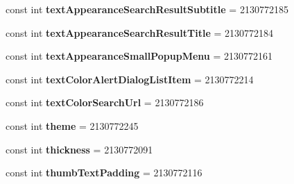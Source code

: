 \begin{DoxyCompactItemize}
\item 
\hypertarget{classClient_1_1Droid_1_1Resource_1_1Attribute_afed6747dd8e5210c715c7e0a85077b0e}{}const int {\bfseries text\+Appearance\+Search\+Result\+Subtitle} = 2130772185\label{classClient_1_1Droid_1_1Resource_1_1Attribute_afed6747dd8e5210c715c7e0a85077b0e}

\item 
\hypertarget{classClient_1_1Droid_1_1Resource_1_1Attribute_ad239aa2f1ee8edb9c2525303c9fb14af}{}const int {\bfseries text\+Appearance\+Search\+Result\+Title} = 2130772184\label{classClient_1_1Droid_1_1Resource_1_1Attribute_ad239aa2f1ee8edb9c2525303c9fb14af}

\item 
\hypertarget{classClient_1_1Droid_1_1Resource_1_1Attribute_ac41013b7d72d884532685fde2d8ad5b7}{}const int {\bfseries text\+Appearance\+Small\+Popup\+Menu} = 2130772161\label{classClient_1_1Droid_1_1Resource_1_1Attribute_ac41013b7d72d884532685fde2d8ad5b7}

\item 
\hypertarget{classClient_1_1Droid_1_1Resource_1_1Attribute_ab0ae99ffe7a2f2f27696dba85870a15c}{}const int {\bfseries text\+Color\+Alert\+Dialog\+List\+Item} = 2130772214\label{classClient_1_1Droid_1_1Resource_1_1Attribute_ab0ae99ffe7a2f2f27696dba85870a15c}

\item 
\hypertarget{classClient_1_1Droid_1_1Resource_1_1Attribute_a39616d5e869244d0aafd67fd19157659}{}const int {\bfseries text\+Color\+Search\+Url} = 2130772186\label{classClient_1_1Droid_1_1Resource_1_1Attribute_a39616d5e869244d0aafd67fd19157659}

\item 
\hypertarget{classClient_1_1Droid_1_1Resource_1_1Attribute_accaf07c8efc03d80de76fb473ffdbc1d}{}const int {\bfseries theme} = 2130772245\label{classClient_1_1Droid_1_1Resource_1_1Attribute_accaf07c8efc03d80de76fb473ffdbc1d}

\item 
\hypertarget{classClient_1_1Droid_1_1Resource_1_1Attribute_a5dea698f3dc15699b3c5d4a13ac88eb9}{}const int {\bfseries thickness} = 2130772091\label{classClient_1_1Droid_1_1Resource_1_1Attribute_a5dea698f3dc15699b3c5d4a13ac88eb9}

\item 
\hypertarget{classClient_1_1Droid_1_1Resource_1_1Attribute_a92bae8664010b9b74a6be55224499a95}{}const int {\bfseries thumb\+Text\+Padding} = 2130772116\label{classClient_1_1Droid_1_1Resource_1_1Attribute_a92bae8664010b9b74a6be55224499a95}


\end{DoxyCompactItemize}
